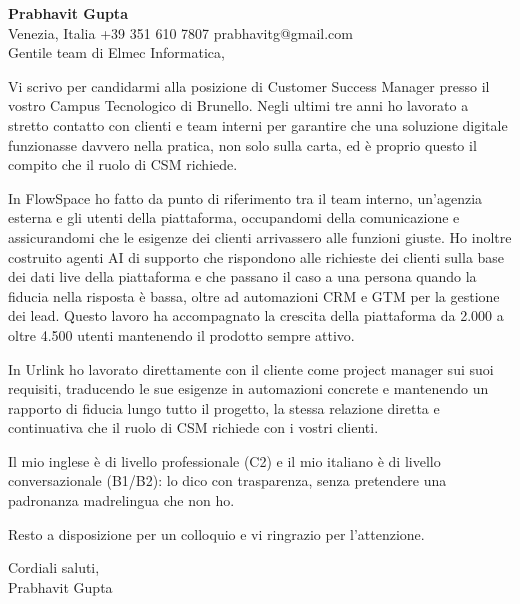 \documentclass[a4paper,10.5pt]{article}
\begin{document}
\textbf{Prabhavit Gupta}\\
Venezia, Italia \textbar{} +39 351 610 7807 \textbar{} prabhavitg@gmail.com\\[10pt]
Gentile team di Elmec Informatica,

Vi scrivo per candidarmi alla posizione di Customer Success Manager presso il vostro Campus Tecnologico di Brunello. Negli ultimi tre anni ho lavorato a stretto contatto con clienti e team interni per garantire che una soluzione digitale funzionasse davvero nella pratica, non solo sulla carta, ed è proprio questo il compito che il ruolo di CSM richiede.

In FlowSpace ho fatto da punto di riferimento tra il team interno, un'agenzia esterna e gli utenti della piattaforma, occupandomi della comunicazione e assicurandomi che le esigenze dei clienti arrivassero alle funzioni giuste. Ho inoltre costruito agenti AI di supporto che rispondono alle richieste dei clienti sulla base dei dati live della piattaforma e che passano il caso a una persona quando la fiducia nella risposta è bassa, oltre ad automazioni CRM e GTM per la gestione dei lead. Questo lavoro ha accompagnato la crescita della piattaforma da 2.000 a oltre 4.500 utenti mantenendo il prodotto sempre attivo.

In Urlink ho lavorato direttamente con il cliente come project manager sui suoi requisiti, traducendo le sue esigenze in automazioni concrete e mantenendo un rapporto di fiducia lungo tutto il progetto, la stessa relazione diretta e continuativa che il ruolo di CSM richiede con i vostri clienti.

Il mio inglese è di livello professionale (C2) e il mio italiano è di livello conversazionale (B1/B2): lo dico con trasparenza, senza pretendere una padronanza madrelingua che non ho.

Resto a disposizione per un colloquio e vi ringrazio per l'attenzione.

Cordiali saluti,\\
Prabhavit Gupta
\end{document}
